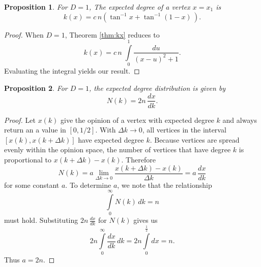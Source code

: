 \documentclass[a4paper,10pt]{article}
\newtheorem{prop}{Proposition}
\begin{document}
\begin{prop}
For $D = 1$, The expected degree of a vertex $x = x_1$ is
 \begin{equation}
 k(x) = c\,n\left(\tan^{-1} x + \tan^{-1} (1-x)\,\right).
\end{equation}
\end{prop}
\begin{proof}
When $D=1$, Theorem \ref{thm:kx} reduces to
\begin{equation}
 k(x) = c\,n\;\int\limits_{0}^{1} \frac{du}{(x - u)^2 + 1}.
\end{equation}
Evaluating the integral yields our result.
\end{proof}
\begin{prop}
 For $D=1$, the expected degree distribution is given by
 \begin{equation}
  N(k) = 2n \,\frac{dx}{dk}.
 \end{equation}
\end{prop}
\begin{proof}
Let $x(k)$ give the opinion of a vertex with expected degree $k$ and always return an a value in $[0, 1/2]$.  
With $\Delta k \to 0$, all vertices in the interval $[x(k), x(k + \Delta k)]$ have expected degree $k$. Because vertices are spread evenly within the opinion space, the number of vertices that have degree $k$ is proportional to $x(k + \Delta k) - x(k)$. Therefore
\begin{equation}
 N(k) = a \lim\limits_{\Delta k \to 0} \frac{x(k + \Delta k) - x(k)}{\Delta k} = a \, \frac{dx}{dk}
\end{equation}
for some constant $a$. To determine $a$, we note that the relationship 
\begin{equation}
\label{eqn:Nsum}
 \int\limits_{0}^\infty N(k)\, dk = n
\end{equation}
must hold. Substituting $2n \, \frac{dx}{dk}$ for $N(k)$ gives us 
\begin{equation}
 2n\int\limits_{0}^\infty \frac{dx}{dk} \, dk = 2n\int\limits_{0}^{\frac{1}{2}} dx = n.
\end{equation}
Thus $a = 2n$.
\end{proof}
\end{document}
